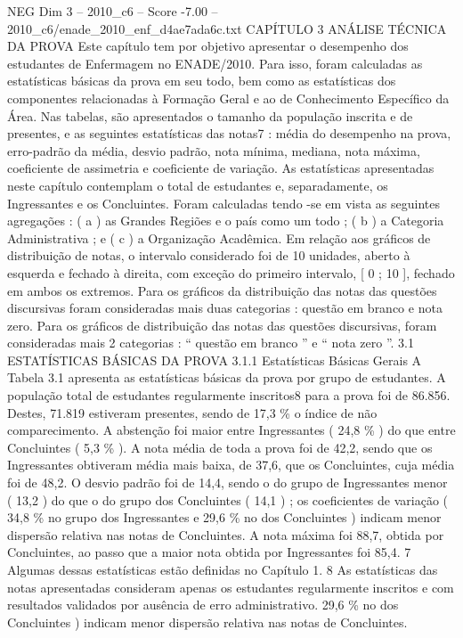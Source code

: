 \begin{textsample}{NEG Dim 3 – 2010\_c6 – Score -7.00 – 2010\_c6/enade\_2010\_enf\_d4ae7ada6c.txt}  \label{ex:f3_neg_006}
CAPÍTULO 3 ANÁLISE TÉCNICA DA PROVA Este capítulo tem por objetivo apresentar o desempenho dos estudantes de Enfermagem no ENADE/2010.
Para isso, foram calculadas as estatísticas básicas da prova em seu todo, bem como as estatísticas dos componentes relacionadas à Formação Geral e ao de Conhecimento Específico da Área.
Nas tabelas, são apresentados o tamanho da população inscrita e de presentes, e as seguintes estatísticas das notas7 : média do desempenho na prova, erro-padrão da média, desvio padrão, nota mínima, mediana, nota máxima, coeficiente de assimetria e coeficiente de variação.
As estatísticas apresentadas neste capítulo contemplam o total de estudantes e, separadamente, os Ingressantes e os Concluintes.
Foram calculadas tendo -se em vista as seguintes agregações : ( a ) as Grandes Regiões e o país como um todo ; ( b ) a Categoria Administrativa ; e ( c ) a Organização Acadêmica.
Em relação aos gráficos de distribuição de notas, o intervalo considerado foi de 10 unidades, aberto à esquerda e fechado à direita, com exceção do primeiro intervalo, [ 0 ; 10 ], fechado em ambos os extremos.
Para os gráficos da distribuição das notas das questões discursivas foram consideradas mais duas categorias : questão em branco e nota zero.
Para os gráficos de distribuição das notas das questões discursivas, foram consideradas mais 2 categorias : “ questão em branco ” e “ nota zero ”. 3.1 ESTATÍSTICAS BÁSICAS DA PROVA 3.1.1 Estatísticas Básicas Gerais A Tabela 3.1 apresenta as estatísticas básicas da prova por grupo de estudantes.
A população total de estudantes regularmente inscritos8 para a prova foi de 86.856.
Destes, 71.819 estiveram presentes, sendo de 17,3 \% o índice de não comparecimento.
A abstenção foi maior entre Ingressantes ( 24,8 \% ) do que entre Concluintes ( 5,3 \% ).
A nota média de toda a prova foi de 42,2, sendo que os Ingressantes obtiveram média mais baixa, de 37,6, que os Concluintes, cuja média foi de 48,2.
O desvio padrão foi de 14,4, sendo o do grupo de Ingressantes menor ( 13,2 ) do que o do grupo dos Concluintes ( 14,1 ) ; os coeficientes de variação ( 34,8 \% no grupo dos Ingressantes e 29,6 \% no dos Concluintes ) indicam menor dispersão relativa nas notas de Concluintes.
A nota máxima foi 88,7, obtida por Concluintes, ao passo que a maior nota obtida por Ingressantes foi 85,4. 7 Algumas dessas estatísticas estão definidas no Capítulo 1. 8 As estatísticas das notas apresentadas consideram apenas os estudantes regularmente inscritos e com resultados validados por ausência de erro administrativo. 29,6 \% no dos Concluintes ) indicam menor dispersão relativa nas notas de Concluintes.

\end{textsample}
